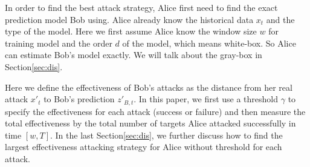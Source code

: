\documentclass[journal]{IEEEtran}
\begin{document}








\newpage

{\color{purple}
In order to find the best attack strategy, Alice first need to find the exact prediction model Bob using. Alice already know the historical data $x_t$ and the type of the model. Here we first assume Alice know the window size $w$ for training model and the order $d$ of the model, which means white-box. So Alice can estimate Bob's model exactly. We will talk about the gray-box in Section\ref{sec:dis}.

Here we define the effectiveness of Bob's attacks as the distance from her real attack $x'_t$ to Bob's prediction $z'_{B,t}$. In this paper, we first use a threshold $\gamma$ to specify the effectiveness for each attack (success or failure) and then measure the total effectiveness by the total number of targets Alice attacked successfully in time $[w, T]$. In the last Section\ref{sec:dis}, we further discuss how to find the largest effectiveness attacking strategy for Alice without threshold for each attack.}
\end{document}
